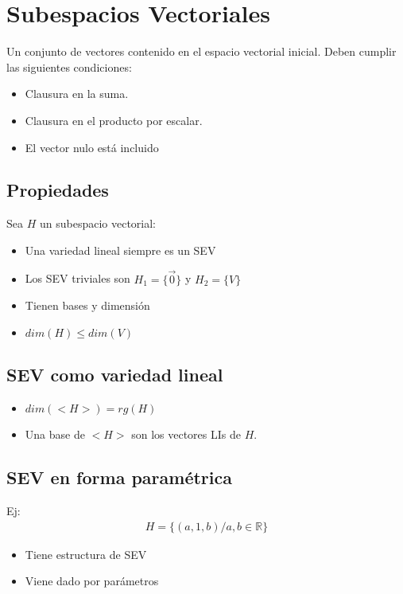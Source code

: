\documentclass{article}
\begin{document}
\section{Subespacios Vectoriales}
Un conjunto de vectores contenido en el espacio vectorial inicial. Deben cumplir las siguientes
condiciones:
\begin{itemize}
    \item Clausura en la suma.
    \item Clausura en el producto por escalar.
    \item El vector nulo está incluido
\end{itemize}
\subsection{Propiedades}
Sea $H$ un subespacio vectorial:
\begin{itemize}
    \item Una variedad lineal siempre es un SEV
    \item Los SEV triviales son $H_{1}= \{ \vec{0} \}$ y $H_{2} = \{ V \}$
    \item Tienen bases y dimensión
    \item $dim(H) \leq dim(V)$
\end{itemize}
\subsection{SEV como variedad lineal}
\begin{itemize}
    \item $dim(<H>)= rg(H)$
    \item Una base de $<H>$ son los vectores LIs de $H$.
\end{itemize}
\subsection{SEV en forma paramétrica}
Ej:
\begin{equation}
    \begin{split}
        H = \{ (a,1,b) / a,b \in \mathbb{R}\}
    \end{split}
\end{equation}
\begin{itemize}
    \item Tiene estructura de SEV
    \item Viene dado por parámetros
\end{itemize}
\end{document}
